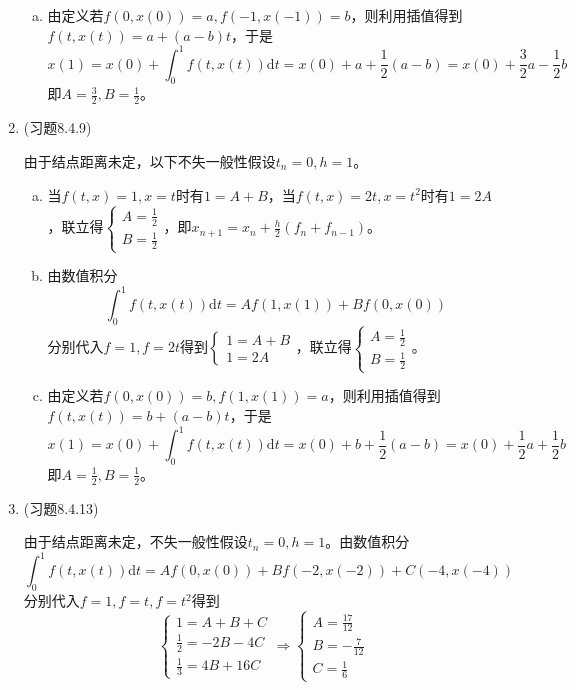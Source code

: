 \documentclass[a4paper,UTF8,fontset=windows]{ctexart}
\begin{document}
\begin{enumerate}
\begin{enumerate}[a.]
    \item
    由定义若$f(0,x(0))=a,f(-1,x(-1))=b$，则利用插值得到$f(t,x(t))=a+(a-b)t$，于是
    $$x(1)=x(0)+\int_0^1f(t,x(t))\mathrm{d}t=x(0)+a+\frac{1}{2}(a-b)=x(0)+\frac{3}{2}a-\frac{1}{2}b$$
    即$A=\frac{3}{2},B=\frac{1}{2}$。
    \end{enumerate}
    
    \item (习题8.4.9)
    
    由于结点距离未定，以下不失一般性假设$t_n=0,h=1$。
    \begin{enumerate}[a.]
    \item
    当$f(t,x)=1,x=t$时有$1=A+B$，当$f(t,x)=2t,x=t^2$时有$1=2A$，联立得$\begin{cases}A=\frac{1}{2}\\B=\frac{1}{2}\end{cases}$，即$x_{n+1}=x_n+\frac{h}{2}(f_n+f_{n-1})$。
    
    \item
    由数值积分
    $$\int_0^1f(t,x(t))\mathrm{d}t=Af(1,x(1))+Bf(0,x(0))$$
    分别代入$f=1,f=2t$得到$\begin{cases}1=A+B\\1=2A\end{cases}$，联立得$\begin{cases}A=\frac{1}{2}\\B=\frac{1}{2}\end{cases}$。
    
    \item
    由定义若$f(0,x(0))=b,f(1,x(1))=a$，则利用插值得到$f(t,x(t))=b+(a-b)t$，于是
    $$x(1)=x(0)+\int_0^1f(t,x(t))\mathrm{d}t=x(0)+b+\frac{1}{2}(a-b)=x(0)+\frac{1}{2}a+\frac{1}{2}b$$
    即$A=\frac{1}{2},B=\frac{1}{2}$。
    \end{enumerate}
    
    \item (习题8.4.13)
    
    由于结点距离未定，不失一般性假设$t_n=0,h=1$。由数值积分
    $$\int_0^1f(t,x(t))\mathrm{d}t=Af(0,x(0))+Bf(-2,x(-2))+C(-4,x(-4))$$
    分别代入$f=1,f=t,f=t^2$得到
    $$\begin{cases}1=A+B+C\\\frac{1}{2}=-2B-4C\\\frac{1}{3}=4B+16C\end{cases}\Rightarrow\begin{cases}A=\frac{17}{12}\\B=-\frac{7}{12}\\C=\frac{1}{6}\end{cases}$$
    

\end{enumerate}
\end{document}
